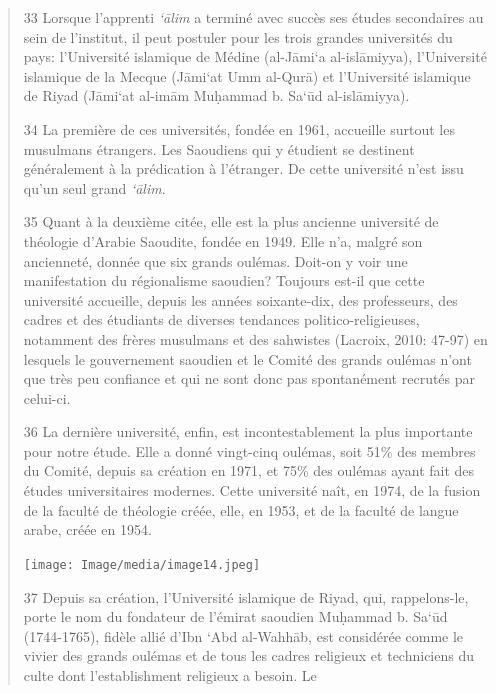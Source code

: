 \begin{quote}
33 Lorsque l'apprenti \emph{`ālim} a terminé avec succès ses études
secondaires au sein de l'institut, il peut postuler pour les trois
grandes universités du pays: l'Université islamique de Médine (al-Jāmi`a
al-islāmiyya), l'Université islamique de la Mecque (Jāmi`at Umm al-Qurā)
et l'Université islamique de Riyad (Jāmi`at al-imām Muḥammad b. Sa`ūd
al-islāmiyya).

34 La première de ces universités, fondée en 1961, accueille surtout les
musulmans étrangers. Les Saoudiens qui y étudient se destinent
généralement à la prédication à l'étranger. De cette université n'est
issu qu'un seul grand \emph{`ālim}.

35 Quant à la deuxième citée, elle est la plus ancienne université de
théologie d'Arabie Saoudite, fondée en 1949. Elle n'a, malgré son
ancienneté, donnée que six grands oulémas. Doit-on y voir une
manifestation du régionalisme saoudien? Toujours est-il que cette
université accueille, depuis les années soixante-dix, des professeurs,
des cadres et des étudiants de diverses tendances politico-religieuses,
notamment des frères musulmans et des sahwistes (Lacroix, 2010: 47-97)
en lesquels le gouvernement saoudien et le Comité des grands oulémas
n'ont que très peu confiance et qui ne sont donc pas spontanément
recrutés par celui-ci.

36 La dernière université, enfin, est incontestablement la plus
importante pour notre étude. Elle a donné vingt-cinq oulémas, soit 51\%
des membres du Comité, depuis sa création en 1971, et 75\% des oulémas
ayant fait des études universitaires modernes. Cette université naît, en
1974, de la fusion de la faculté de théologie créée, elle, en 1953, et
de la faculté de langue arabe, créée en 1954.

\texttt{[image: Image/media/image14.jpeg]}

37 Depuis sa création, l'Université islamique de Riyad, qui,
rappelons-le, porte le nom du fondateur de l'émirat saoudien Muḥammad b.
Sa`ūd (1744-1765), fidèle allié d'Ibn `Abd al-Wahhāb, est considérée
comme le vivier des grands oulémas et de tous les cadres religieux et
techniciens du culte dont l'establishment religieux a besoin. Le


\end{quote}
